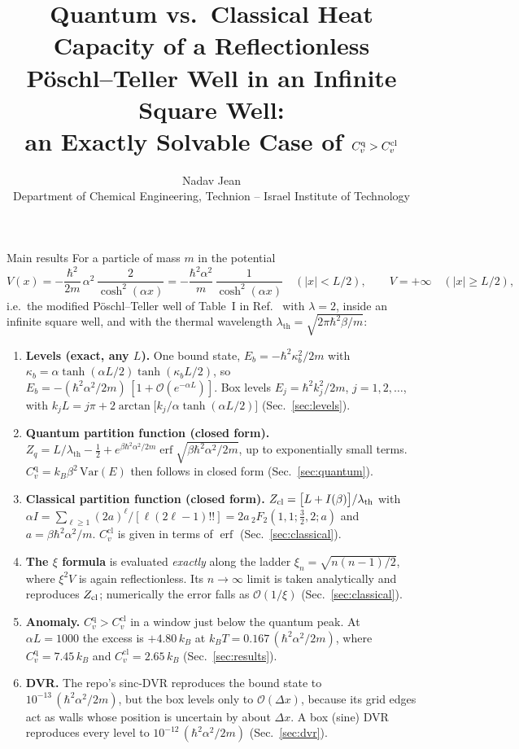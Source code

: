 \documentclass[11pt]{article}
\title{Quantum vs.\ Classical Heat Capacity of a Reflectionless\\
P\"oschl--Teller Well in an Infinite Square Well:\\
an Exactly Solvable Case of $\Cq > \Ccl$}
\author{Nadav Jean\\[1mm]
\small Department of Chemical Engineering, Technion -- Israel Institute of Technology}
\date{}
\numberwithin{equation}{section}
\providecommand{\erf}{\operatorname{erf}}
\newcommand{\lth}{\lambda_{\mathrm{th}}}
\newcommand{\Cq}{C_v^{\mathrm{q}}}
\newcommand{\Ccl}{C_v^{\mathrm{cl}}}
\newcommand{\kB}{k_{B}}
\begin{document}
\maketitle
\thispagestyle{fancy}

\begin{resultbox}{Main results}
For a particle of mass $m$ in the potential
\[
V(x)=-\frac{\hbar^2}{2m}\,\alpha^2\,\frac{2}{\cosh^2(\alpha x)}=-\frac{\hbar^2\alpha^2}{m}\,\frac{1}{\cosh^2(\alpha x)}\quad (|x|<L/2),\qquad V=+\infty\quad(|x|\ge L/2),
\]
i.e.\ the modified P\"oschl--Teller well of Table~I in Ref.~\cite{deffner2014} with $\lambda=2$, inside an infinite square well, and with the thermal wavelength $\lth=\sqrt{2\pi\hbar^2\beta/m}$:
\begin{enumerate}[leftmargin=*,itemsep=2pt]
\item \textbf{Levels (exact, any $L$).} One bound state, $E_b=-\hbar^2\kappa_b^2/2m$ with $\kappa_b=\alpha\tanh(\alpha L/2)\tanh(\kappa_bL/2)$, so $E_b=-(\hbar^2\alpha^2/2m)\,[1+\mathcal O(e^{-\alpha L})]$. Box levels $E_j=\hbar^2k_j^2/2m$, $j=1,2,\dots$, with
$k_jL=j\pi+2\arctan\!\big[k_j/\alpha\tanh(\alpha L/2)\big]$ (Sec.~\ref{sec:levels}).
\item \textbf{Quantum partition function (closed form).} $Z_q=L/\lth-\tfrac12+e^{\beta\hbar^2\alpha^2/2m}\erf\sqrt{\beta\hbar^2\alpha^2/2m}$, up to exponentially small terms. $\Cq=\kB\beta^2\,\mathrm{Var}(E)$ then follows in closed form (Sec.~\ref{sec:quantum}).
\item \textbf{Classical partition function (closed form).} $Z_{\rm cl}=\big[L+I(\beta)\big]/\lth$ with $\alpha I=\sum_{\ell\ge1}(2a)^\ell/[\ell(2\ell-1)!!]=2a\,{}_2F_2(1,1;\tfrac32,2;a)$ and $a=\beta\hbar^2\alpha^2/m$. $\Ccl$ is given in terms of $\erf$ (Sec.~\ref{sec:classical}).
\item \textbf{The $\xi$ formula} is evaluated \emph{exactly} along the ladder $\xi_n=\sqrt{n(n-1)/2}$, where $\xi^2V$ is again reflectionless. Its $n\to\infty$ limit is taken analytically and reproduces $Z_{\rm cl}$; numerically the error falls as $\mathcal O(1/\xi)$ (Sec.~\ref{sec:classical}).
\item \textbf{Anomaly.} $\Cq>\Ccl$ in a window just below the quantum peak. At $\alpha L=1000$ the excess is $+4.80\,\kB$ at $\kB T=0.167\,(\hbar^2\alpha^2/2m)$, where $\Cq=7.45\,\kB$ and $\Ccl=2.65\,\kB$ (Sec.~\ref{sec:results}).
\item \textbf{DVR.} The repo's sinc-DVR reproduces the bound state to $10^{-13}\,(\hbar^2\alpha^2/2m)$, but the box levels only to $\mathcal O(\Delta x)$, because its grid edges act as walls whose position is uncertain by about $\Delta x$. A box (sine) DVR reproduces every level to $10^{-12}\,(\hbar^2\alpha^2/2m)$ (Sec.~\ref{sec:dvr}).

\end{enumerate}
\end{resultbox}
\end{document}
